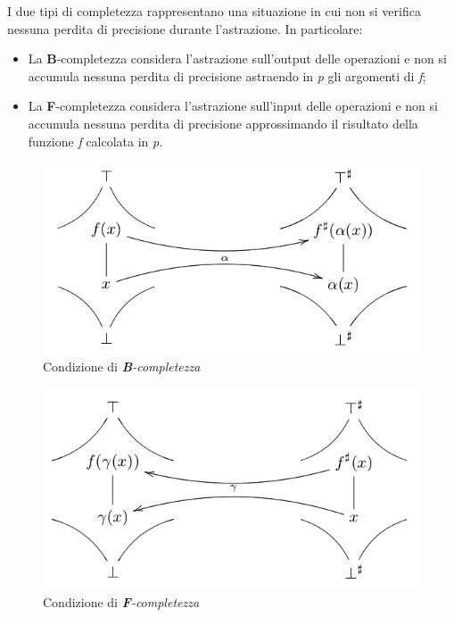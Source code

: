 \documentclass{article}
\begin{document}
            I due tipi di completezza rappresentano una situazione in cui non si verifica nessuna perdita di precisione durante l'astrazione. In particolare:
            \begin{itemize}
                \item La \textbf{B}-completezza considera l'astrazione sull'output delle operazioni e non si accumula nessuna perdita di precisione astraendo in \textit{p} gli argomenti di \textit{f};
                \item La \textbf{F}-completezza considera l'astrazione sull'input delle operazioni e non si accumula nessuna perdita di precisione approssimando il risultato della funzione \textit{f} calcolata in \textit{p}.
            \end{itemize}
            
            \begin{multicols}{2}	
                \begin{figure}[H]
                    \centering
                    \includegraphics[scale=0.33]{Backward}
                    \caption{Condizione di \textit{\textbf{B}-completezza}}
                    \label{Backward}
                \end{figure}
                \columnbreak
                \begin{figure}[H]
                    \centering
                    \includegraphics[scale=0.33]{Forward}
                    \caption{Condizione di \textit{\textbf{F}-completezza}}
                    \label{Forward}
                \end{figure}
            \end{multicols}
\end{document}
